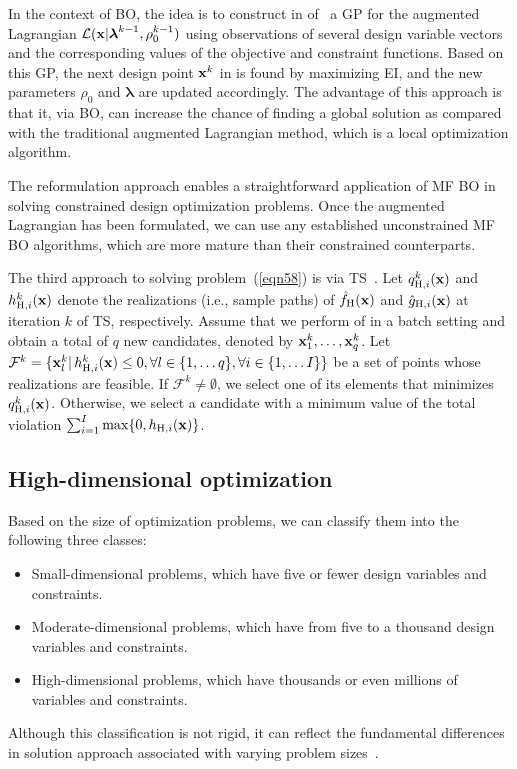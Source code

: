 \documentclass[journal ]{new-aiaa}
\begin{document}
	In the context of BO, the idea is to construct in  of~ a GP for the augmented Lagrangian $\mathcal{L}({\bf x}|\boldsymbol{\lambda}^{k-1},\rho^{k-1}_0)$ using observations of several design variable vectors and the corresponding values of the objective and constraint functions.
	Based on this GP, the next design point ${\bf x}^{k}$ in  is found by maximizing EI, and the new parameters $\rho_0$ and $\boldsymbol{\lambda}$ are updated accordingly.
	The advantage of this approach is that it, via BO, can increase the chance of finding a global solution as compared with the traditional augmented Lagrangian method, which is a local optimization algorithm.
	
	The reformulation approach enables a straightforward application of MF BO in solving constrained design optimization problems.
	Once the augmented Lagrangian has been formulated, we can use any established unconstrained MF BO algorithms, which are more mature than their constrained counterparts.
	
	The third approach to solving problem~(\ref{eqn58}) is via TS~\citep{Eriksson2021}.
	Let $q^k_{\text{H},i}({\bf x})$ and $h^k_{\text{H},i}({\bf x})$ denote the realizations (i.e., sample paths) of $\hat{f}_{\text{H}}({\bf x})$ and $\hat{g}_{\text{H},i}({\bf x})$ at iteration $k$ of TS, respectively.
	Assume that we perform  of  in a batch setting and obtain a total of $q$ new candidates, denoted by ${\bf x}^k_1,\dots, {\bf x}^k_q$.
	Let $\mathcal{F}^k = \{{\bf x}^k_l|\,h^k_{\text{H},i}({\bf x}) \leq 0,\forall l \in \{1,\dots q\}, \forall i \in \{1,\dots I\}\}$ be a set of points whose realizations are feasible.
	If $\mathcal{F}^k \neq \emptyset$, we select one of its elements that minimizes $q^k_{\text{H},i}({\bf x})$.
	Otherwise, we select a candidate with a minimum value of the total violation
	$\sum_{i=1}^{I} \max\{0,h_{\text{H},i}({\bf x})\}$.
	
	\subsection{High-dimensional optimization}\label{Sec62}
	
	Based on the size of optimization problems, we can classify them into the following three classes: 
	\begin{itemize}
		\item Small-dimensional problems, which have five or fewer design variables and constraints.
		
		\item Moderate-dimensional problems, which have from five to a thousand design variables and constraints.
		
		\item High-dimensional problems, which have thousands or even millions of variables and constraints.
	\end{itemize}
	Although this classification is not rigid, it can reflect the fundamental differences in solution approach associated with varying problem sizes~\citep{Luenberger2008}.
	
\end{document}
